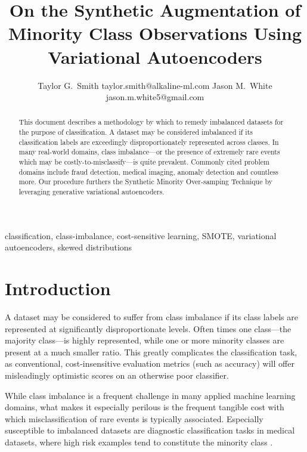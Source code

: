 \documentclass[twoside,11pt]{article}
\begin{document}
\title{On the Synthetic Augmentation of Minority Class Observations Using Variational Autoencoders}

\author{\name Taylor G.\ Smith \email taylor.smith@alkaline-ml.com
       \AND
       \name Jason M.\ White \email jason.m.white5@gmail.com}

\maketitle

\begin{abstract}%
This document describes a methodology by which to remedy imbalanced datasets for the purpose of classification. A dataset may be considered imbalanced if its classification labels are exceedingly disproportionately represented across classes. In many real-world domains, class imbalance---or the presence of extremely rare events which may be costly-to-misclassify---is quite prevalent. Commonly cited problem domains include fraud detection, medical imaging, anomaly detection and countless more.  Our procedure furthers the Synthetic Minority Over-samping Technique \citep{chawla2002smote} by leveraging generative variational autoencoders.
\end{abstract}

\begin{keywords}
  classification, class-imbalance, cost-sensitive learning, SMOTE, variational autoencoders, skewed distributions
\end{keywords}

\section{Introduction}

A dataset may be considered to suffer from class imbalance if its class labels are represented at significantly disproportionate levels. Often times one class---the majority class---is highly represented, while one or more minority classes are present at a much smaller ratio. This greatly complicates the classification task, as conventional, cost-insensitive evaluation metrics (such as accuracy) will offer misleadingly optimistic scores on an otherwise poor classifier. 

While class imbalance is a frequent challenge in many applied machine learning domains, what makes it especially perilous is the frequent tangible cost with which misclassification of rare events is typically associated. Especially susceptible to imbalanced datasets are diagnostic classification tasks in medical datasets, where high risk examples tend to constitute the minority class \citep{rahman2013addressing}.
\end{document}
